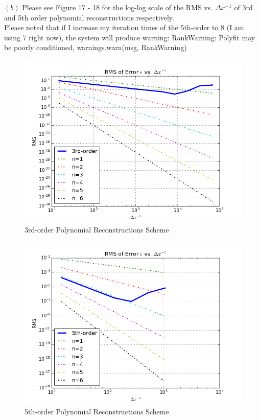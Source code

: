 \documentclass[12pt]{article}
\newenvironment{problem}[2][Problem]{\begin{trivlist}
\item[\hskip \labelsep {\bfseries #1}\hskip \labelsep {\bfseries #2.}]}{\end{trivlist}}
\begin{document}
\begin{problem}{2}
$(b)$ Please see Figure 17 - 18 for the log-log scale of the RMS vs. $\Delta x^{-1}$ of 3rd and 5th order polynomial reconstructions respectively.\\
Please noted that if I increase my iteration times of the 5th-order to 8 (I am using 7 right now), the system will produce warning: RankWarning: Polyfit may be poorly conditioned, warnings.warn(msg, RankWarning)\\
\begin{figure}
\centering
  \includegraphics[scale=0.5]{p2b_3p}
 \caption{3rd-order Polynomial Reconstructions Scheme}
\label{label}
\end{figure}
\begin{figure}
\centering
  \includegraphics[scale=0.5]{p2b_5p}
 \caption{5th-order Polynomial Reconstructions Scheme}
\label{label}
\end{figure}
\end{problem}
\end{document}
